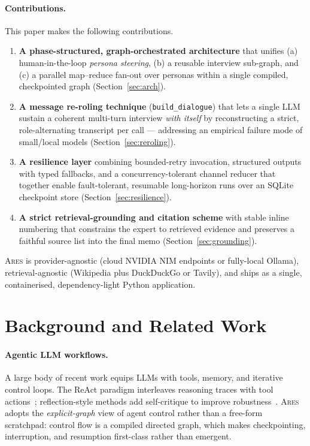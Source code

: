 \documentclass[10pt,twocolumn]{article}
\newcommand{\ares}{\textsc{Ares}}
\newcommand{\code}[1]{\texttt{\small #1}}
\begin{document}
\paragraph{Contributions.} This paper makes the following contributions.
\begin{enumerate}[leftmargin=1.2em,itemsep=2pt]
  \item \textbf{A phase-structured, graph-orchestrated architecture} that unifies
  (a) human-in-the-loop \emph{persona steering}, (b) a reusable interview
  sub-graph, and (c) a parallel map--reduce fan-out over personas within a single
  compiled, checkpointed graph (Section~\ref{sec:arch}).
  \item \textbf{A message re-roling technique} (\code{build\_dialogue}) that lets
  a single LLM sustain a coherent multi-turn interview \emph{with itself} by
  reconstructing a strict, role-alternating transcript per call --- addressing an
  empirical failure mode of small/local models (Section~\ref{sec:reroling}).
  \item \textbf{A resilience layer} combining bounded-retry invocation, structured
  outputs with typed fallbacks, and a concurrency-tolerant channel reducer that
  together enable fault-tolerant, resumable long-horizon runs over an
  SQLite checkpoint store (Section~\ref{sec:resilience}).
  \item \textbf{A strict retrieval-grounding and citation scheme} with stable
  inline numbering that constrains the expert to retrieved evidence and preserves
  a faithful source list into the final memo (Section~\ref{sec:grounding}).
\end{enumerate}

\ares{} is provider-agnostic (cloud NVIDIA NIM endpoints or fully-local Ollama),
retrieval-agnostic (Wikipedia plus DuckDuckGo or Tavily), and ships as a
single, containerised, dependency-light Python application.

\section{Background and Related Work}
\label{sec:related}

\paragraph{Agentic LLM workflows.} A large body of recent work equips LLMs with
tools, memory, and iterative control loops. The ReAct paradigm interleaves
reasoning traces with tool actions~\cite{yao2023react}; reflection-style methods
add self-critique to improve robustness~\cite{shinn2023reflexion}. \ares{}
adopts the \emph{explicit-graph} view of agent control rather than a free-form
scratchpad: control flow is a compiled directed graph, which makes checkpointing,
interruption, and resumption first-class rather than emergent.
\end{document}
